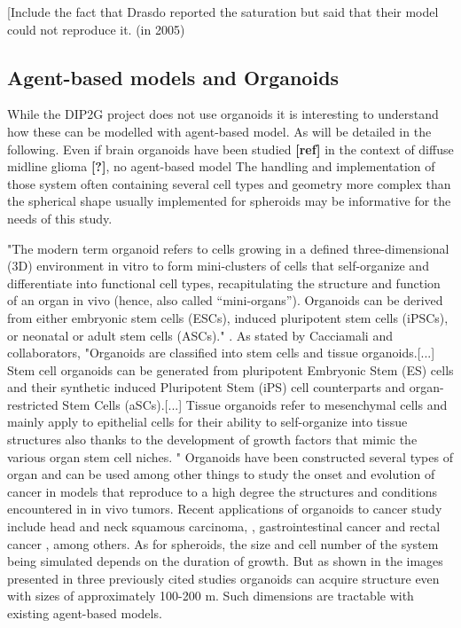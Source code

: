 \documentclass[11pt,a4paper]{article}
\begin{document}
[Include the fact that Drasdo reported the saturation but said that their model could not reproduce it. (in 2005)

\subsection{Agent-based models and Organoids}
While the DIP2G project does not use organoids it is interesting to understand how these can be modelled with agent-based model. As will be detailed in the following. Even if brain organoids have been studied \textbf{[ref]} in the context of diffuse midline glioma \textbf{[?]}, no agent-based model The handling and implementation of those system often containing several cell types and geometry more complex than the spherical shape usually implemented for spheroids may be informative for the needs of this study.

"The modern term organoid refers to cells growing in a defined three-dimensional (3D) environment in vitro to form mini-clusters of cells that self-organize and differentiate into functional cell types, recapitulating the structure and function of an organ in vivo (hence, also called “mini-organs”). Organoids can be derived from either embryonic stem cells (ESCs), induced pluripotent stem cells (iPSCs), or neonatal or adult stem cells (ASCs)." \cite{Corro2020}. As stated by Cacciamali and collaborators, "Organoids are classified into stem cells and tissue organoids.[...] Stem cell organoids can be generated from pluripotent Embryonic Stem (ES) cells and their synthetic induced Pluripotent Stem (iPS) cell counterparts and organ-restricted Stem Cells (aSCs).[...] Tissue organoids refer to mesenchymal cells and mainly apply to epithelial cells for their ability to self-organize into tissue structures also thanks to the development of growth factors that mimic the various organ stem cell niches. "\cite{Cacciamali2022} Organoids have been constructed several types of organ and can be used among other things to study the onset and evolution of cancer in models that reproduce to a high degree the structures and conditions encountered in in vivo tumors. Recent applications of organoids to cancer study include head and neck squamous carcinoma, \cite{Driehuis2020}, gastrointestinal cancer\cite{Vlachogiannis2018} and rectal cancer \cite{Yao2019}, among others. As for spheroids, the size and cell number of the system being simulated depends on the duration of growth. But as shown in the images presented in three previously cited studies organoids can acquire structure even with sizes of approximately 100-200 \textmu m. Such dimensions are tractable with existing agent-based models. 
\end{document}
